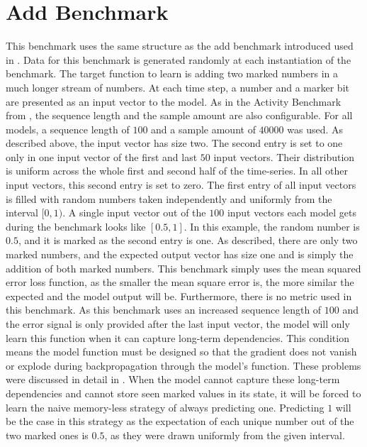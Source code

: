 \documentclass[draft,final]{vutinfth} %
\begin{document}
    \section{Add Benchmark} \label{add}
    This benchmark uses the same structure as the add benchmark introduced used in \cite{UnitaryRNNs}.
    Data for this benchmark is generated randomly at each instantiation of the benchmark.
    The target function to learn is adding two marked numbers in a much longer stream of numbers.
    At each time step, a number and a marker bit are presented as an input vector to the model.
    As in the Activity Benchmark from , the sequence length and the sample amount are also configurable.
    For all models, a sequence length of $100$ and a sample amount of $40000$ was used.
    As described above, the input vector has size two.
    The second entry is set to one only in one input vector of the first and last $50$ input vectors.
    Their distribution is uniform across the whole first and second half of the time-series.
    In all other input vectors, this second entry is set to zero.
    The first entry of all input vectors is filled with random numbers taken independently and uniformly from the interval $[0,1)$.
    A single input vector out of the $100$ input vectors each model gets during the benchmark looks like $[0.5,1]$.
    In this example, the random number is $0.5$, and it is marked as the second entry is one.
    As described, there are only two marked numbers, and the expected output vector has size one and is simply the addition of both marked numbers.
    This benchmark simply uses the mean squared error loss function, as the smaller the mean square error is, the more similar the expected and the model output will be.
    Furthermore, there is no metric used in this benchmark.
    As this benchmark uses an increased sequence length of $100$ and the error signal is only provided after the last input vector, the model will only learn this function when it can capture long-term dependencies.
    This condition means the model function must be designed so that the gradient does not vanish or explode during backpropagation through the model's function.
    These problems were discussed in detail in .
    When the model cannot capture these long-term dependencies and cannot store seen marked values in its state, it will be forced to learn the naive memory-less strategy of always predicting one.
    Predicting $1$ will be the case in this strategy as the expectation of each unique number out of the two marked ones is $0.5$, as they were drawn uniformly from the given interval.
\end{document}

